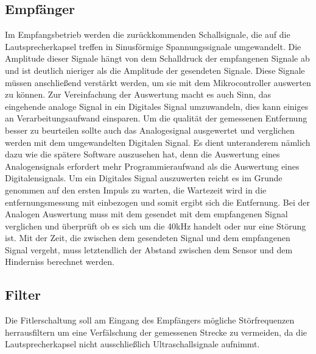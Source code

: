\subsection{Empfänger}
Im Empfangsbetrieb werden die zurückkommenden Schallsignale, die auf die Lautsprecherkapsel treffen in Sinusförmige Spannungssignale umgewandelt. Die Amplitude dieser Signale hängt von dem Schalldruck der empfangenen Signale ab und ist deutlich nieriger als die Amplitude der gesendeten Signale. Diese Signale müssen anschließend verstärkt werden, um sie mit dem Mikrocontroller auswerten zu können. Zur Vereinfachung der Auswertung macht es auch Sinn, das eingehende analoge Signal in ein Digitales Signal umzuwandeln, dies kann einiges an Verarbeitungsaufwand einsparen. Um die qualität der gemessenen Entfernung besser zu beurteilen sollte auch das Analogesignal ausgewertet und verglichen werden mit dem umgewandelten Digitalen Signal. Es dient unteranderem nämlich dazu wie die spätere Software auszusehen hat, denn die Auswertung eines Analogensignals erfordert mehr Programmieraufwand als die Auswertung eines Digitalensignals. Um ein Digitales Signal auszuwerten reicht es im Grunde genommen auf den ersten Impuls zu warten, die Wartezeit wird in die entfernungsmessung mit einbezogen und somit ergibt sich die Entfernung. Bei der Analogen Auswertung muss mit dem gesendet mit dem empfangenen Signal verglichen und überprüft ob es sich um die 40kHz handelt oder nur eine Störung ist.
Mit der Zeit, die zwischen dem gesendeten Signal und dem empfangenen Signal vergeht, muss letztendlich der Abstand zwischen dem Sensor und dem Hinderniss berechnet werden.
\subsection{Filter}
Die Fitlerschaltung soll am Eingang des Empfängers mögliche Störfrequenzen herrausfiltern um eine Verfälschung der gemessenen Strecke zu vermeiden, da die Lautsprecherkapsel nicht ausschließlich Ultraschallsignale aufnimmt.
